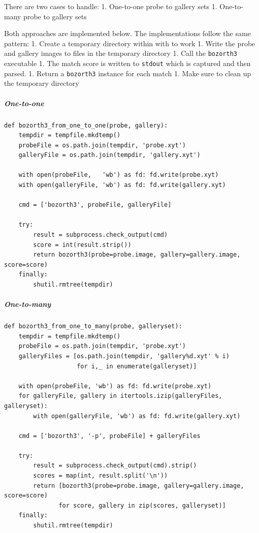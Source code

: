 There are two cases to handle: 1. One-to-one probe to gallery sets 1.
One-to-many probe to gallery sets

Both approaches are implemented below. The implementations follow the
same pattern: 1. Create a temporary directory within with to work 1.
Write the probe and gallery images to files in the temporary directory
1. Call the \texttt{bozorth3} executable 1. The match score is written
to \texttt{stdout} which is captured and then parsed. 1. Return a
\texttt{bozorth3} instance for each match 1. Make sure to clean up the
temporary directory

\subparagraph{One-to-one}\label{one-to-one}

\begin{lstlisting}
def bozorth3_from_one_to_one(probe, gallery):
    tempdir = tempfile.mkdtemp()
    probeFile = os.path.join(tempdir, 'probe.xyt')
    galleryFile = os.path.join(tempdir, 'gallery.xyt')

    with open(probeFile,   'wb') as fd: fd.write(probe.xyt)
    with open(galleryFile, 'wb') as fd: fd.write(gallery.xyt)

    cmd = ['bozorth3', probeFile, galleryFile]

    try:
        result = subprocess.check_output(cmd)
        score = int(result.strip())
        return bozorth3(probe=probe.image, gallery=gallery.image, score=score)
    finally:
        shutil.rmtree(tempdir)
\end{lstlisting}

\subparagraph{One-to-many}\label{one-to-many}

\begin{lstlisting}
def bozorth3_from_one_to_many(probe, galleryset):
    tempdir = tempfile.mkdtemp()
    probeFile = os.path.join(tempdir, 'probe.xyt')
    galleryFiles = [os.path.join(tempdir, 'gallery%d.xyt' % i)
                    for i,_ in enumerate(galleryset)]

    with open(probeFile, 'wb') as fd: fd.write(probe.xyt)
    for galleryFile, gallery in itertools.izip(galleryFiles, galleryset):
        with open(galleryFile, 'wb') as fd: fd.write(gallery.xyt)

    cmd = ['bozorth3', '-p', probeFile] + galleryFiles

    try:
        result = subprocess.check_output(cmd).strip()
        scores = map(int, result.split('\n'))
        return [bozorth3(probe=probe.image, gallery=gallery.image, score=score)
               for score, gallery in zip(scores, galleryset)]
    finally:
        shutil.rmtree(tempdir)
\end{lstlisting}

